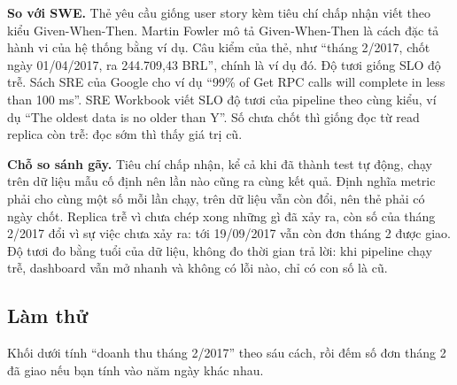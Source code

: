 \begin{ghichu}
\textbf{So với SWE.} Thẻ yêu cầu giống user story kèm tiêu chí chấp nhận viết theo kiểu Given-When-Then. Martin Fowler mô tả Given-When-Then là cách đặc tả hành vi của hệ thống bằng ví dụ. Câu kiểm của thẻ, như ``tháng 2/2017, chốt ngày 01/04/2017, ra 244.709,43 BRL'', chính là ví dụ đó.
Độ tươi giống SLO độ trễ. Sách SRE của Google cho ví dụ ``99\% of Get RPC calls will complete in less than 100 ms''. SRE Workbook viết SLO độ tươi của pipeline theo cùng kiểu, ví dụ ``The oldest data is no older than Y''. Số chưa chốt thì giống đọc từ read replica còn trễ: đọc sớm thì thấy giá trị cũ.

\textbf{Chỗ so sánh gãy.} Tiêu chí chấp nhận, kể cả khi đã thành test tự động, chạy trên dữ liệu mẫu cố định nên lần nào cũng ra cùng kết quả. Định nghĩa metric phải cho cùng một số mỗi lần chạy, trên dữ liệu vẫn còn đổi, nên thẻ phải có ngày chốt. Replica trễ vì chưa chép xong những gì đã xảy ra, còn số của tháng 2/2017 đổi vì sự việc chưa xảy ra: tới 19/09/2017 vẫn còn đơn tháng 2 được giao. Độ tươi đo bằng tuổi của dữ liệu, không đo thời gian trả lời: khi pipeline chạy trễ, dashboard vẫn mở nhanh và không có lỗi nào, chỉ có con số là cũ.
\end{ghichu}

\subsection{Làm thử}

Khối dưới tính ``doanh thu tháng 2/2017'' theo sáu cách, rồi đếm số đơn tháng 2 đã giao nếu bạn tính vào năm ngày khác nhau.

